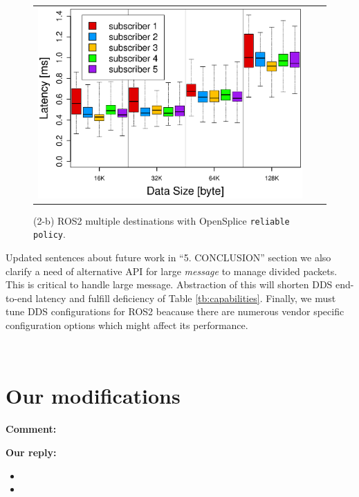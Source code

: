 \documentclass{article}
\begin{document}
\begin{enumerate}
\begin{figure}[h]
\begin{tabular}{ccc}
\begin{minipage}[t]{0.31\textwidth}
        \includegraphics[width=1.0\linewidth]{../../figure/BoxPlot_ospl_128K_multi-pub5.eps}
        \caption{(2-b) ROS2 multiple destinations with OpenSplice \texttt{reliable policy}.}
        \label{fig:ospl_multi_128K}
      \end{minipage}
    \end{tabular}
  \end{figure}
  \begin{itembox}[|]{Updated sentences about future work in ``5. CONCLUSION'' section}
    we also clarify a need of alternative API for large \emph{message} to manage divided packets.
    This is critical to handle large message.
    Abstraction of this will shorten DDS end-to-end latency and fulfill deficiency of Table \ref{tb:capabilities}.
    Finally, we must tune DDS configurations for ROS2 beacause there are numerous vendor specific configuration options which might affect its performance.
  \end{itembox}\\

\end{enumerate}

\newpage


\section{Our modifications}

\begin{flushleft}
  \textbf{Comment:}
\end{flushleft}

\begin{flushleft}
  \textbf{Our reply:}
\end{flushleft}

\begin{itemize}
\item 
\item
\end{itemize}
\end{document}
